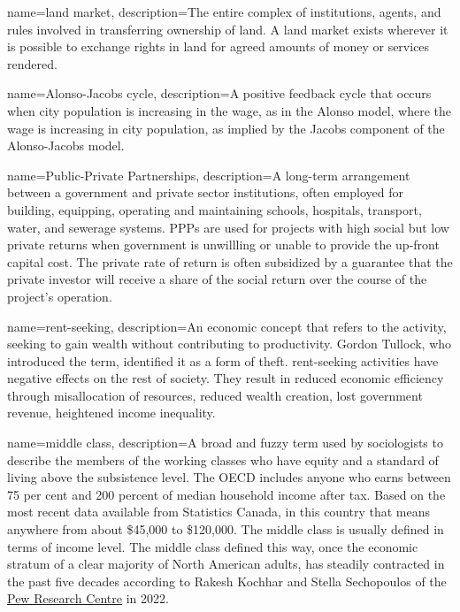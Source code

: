 {
name=land market,
description={The entire complex of institutions, agents, and rules involved in transferring ownership of land. A land market exists wherever it is possible to exchange rights in land for agreed amounts of money or services rendered.}
}

{
name=Alonso-Jacobs cycle,
description={A positive \gls{feedback} cycle that occurs when city population is increasing in the wage, as in the Alonso model, where the wage is increasing in city population, as implied by the Jacobs component of the \gls{Alonso-Jacobs model}.}
}

{
name=Public-Private Partnerships,
description={A long-term arrangement between a government and private sector institutions, often  employed for building, equipping, operating and maintaining schools, hospitals, transport, water, and sewerage systems. PPPs are used for projects with high social but low private returns when government is unwillling or unable to provide the up-front capital cost. The private rate of return is often subsidized by a guarantee that the private investor will receive a share of the social return over the course of the project's operation.}
}

{
name=rent-seeking,
description={An economic concept that refers to the activity, seeking to gain wealth without contributing to productivity. Gordon Tullock, who introduced  the term, identified it as a form of theft\cite{tullockWelfareCostsTariffs1967}.  %
\Gls{rent-seeking} activities have negative effects on the rest of society. They result in reduced economic efficiency through misallocation of resources, reduced wealth creation, lost government revenue, heightened income inequality.}
}

{
name=middle class,
description={A broad and fuzzy term used by sociologists to describe the members of the working classes who have equity and a standard of living above the subsistence level. The OECD includes anyone who earns between 75 per cent and 200 percent of median household income after tax. Based on the most recent data available from Statistics Canada, in this country that means anywhere from about \$45,000 to \$120,000. The middle class is usually defined in terms of income level. The middle class defined this way, once the economic stratum of a clear majority of North American adults, has steadily contracted in the past five decades according to
Rakesh Kochhar and  Stella Sechopoulos of the \href{https://www.pewresearch.org/fact-tank/2022/04/20/how-the-american-middle-class-has-changed-in-the-past-five-decades/}{Pew Research Centre}  in 2022.}
}

